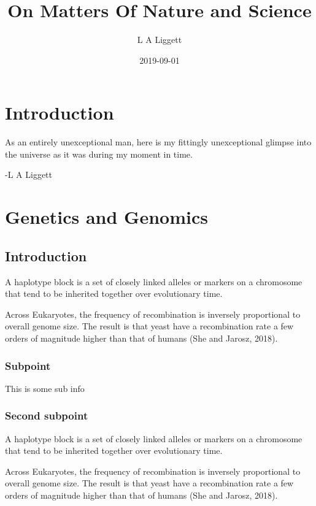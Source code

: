 \documentclass[]{book}
\title{On Matters Of Nature and Science}
\author{L A Liggett}
\date{2019-09-01}
\begin{document}
\maketitle

{
\setcounter{tocdepth}{1}
\tableofcontents
}
\chapter{Introduction}\label{introduction}

As an entirely unexceptional man, here is my fittingly unexceptional
glimpse into the universe as it was during my moment in time.

-L A Liggett

\chapter{Genetics and Genomics}\label{g2}

\section{Introduction}\label{introduction-1}

A haplotype block is a set of closely linked alleles or markers on a
chromosome that tend to be inherited together over evolutionary time.

Across Eukaryotes, the frequency of recombination is inversely
proportional to overall genome size. The result is that yeast have a
recombination rate a few orders of magnitude higher than that of humans
(She and Jarosz, 2018).

\subsection{Subpoint}\label{subpoint}

This is some sub info

\subsection{Second subpoint}\label{second-subpoint}

A haplotype block is a set of closely linked alleles or markers on a
chromosome that tend to be inherited together over evolutionary time.

Across Eukaryotes, the frequency of recombination is inversely
proportional to overall genome size. The result is that yeast have a
recombination rate a few orders of magnitude higher than that of humans
(She and Jarosz, 2018).
\end{document}
